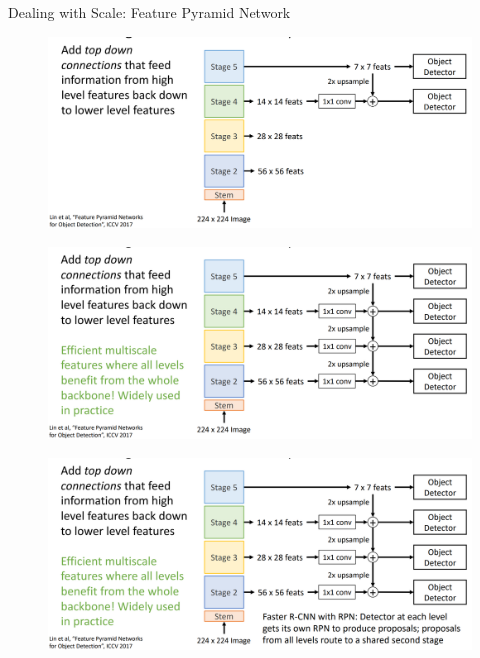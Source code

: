 \documentclass[10pt]{beamer}
\theoremstyle{remark}
\theoremstyle{definition}
\begin{document}
\begin{frame}[allowframebreaks]{Dealing with Scale: Feature Pyramid Network}
\begin{figure}
\centering
\includegraphics[width=1.0\textwidth,height=1.0\textheight,keepaspectratio]{./images/scale_6.png}
\end{figure}

\framebreak

\begin{figure}
\centering
\includegraphics[width=1.0\textwidth,height=1.0\textheight,keepaspectratio]{./images/scale_7.png}
\end{figure}

\framebreak

\begin{figure}
\centering
\includegraphics[width=1.0\textwidth,height=1.0\textheight,keepaspectratio]{./images/scale_8.png}
\end{figure}
    
\end{frame}
\end{document}
